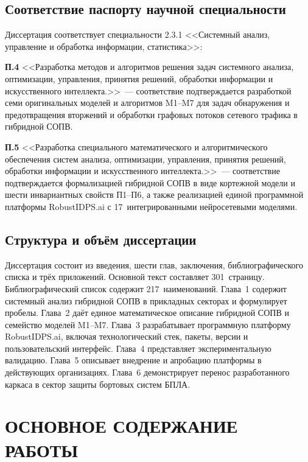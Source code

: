 \documentclass[12pt,a5paper]{article}
\begin{document}
\subsection*{Соответствие паспорту научной специальности}

Диссертация соответствует специальности 2.3.1 <<Системный
анализ, управление и обработка информации, статистика>>:

\noindent\textbf{П.4} <<Разработка методов и алгоритмов
решения задач системного анализа, оптимизации, управления,
принятия решений, обработки информации и искусственного
интеллекта.>>~--- соответствие подтверждается разработкой
семи оригинальных моделей и алгоритмов M1--M7 для задач
обнаружения и предотвращения вторжений и обработки
графовых потоков сетевого трафика в гибридной СОПВ.

\noindent\textbf{П.5} <<Разработка специального
математического и алгоритмического обеспечения систем
анализа, оптимизации, управления, принятия решений,
обработки информации и искусственного интеллекта.>>~---
соответствие подтверждается формализацией гибридной СОПВ в
виде кортежной модели и шести инвариантных свойств П1--П6,
а также реализацией единой программной платформы
RobustIDPS.ai с 17~интегрированными нейросетевыми моделями.

\subsection*{Структура и объём диссертации}

Диссертация состоит из введения, шести глав, заключения,
библиографического списка и трёх приложений. Основной текст
составляет 301~страницу. Библиографический список содержит
217~наименований. Глава~1 содержит системный анализ
гибридной СОПВ в прикладных секторах и формулирует пробелы.
Глава~2 даёт единое математическое описание гибридной СОПВ
и семейство моделей M1--M7. Глава~3 разрабатывает программную
платформу RobustIDPS.ai, включая технологический стек,
пакеты, версии и пользовательский интерфейс. Глава~4
представляет экспериментальную валидацию. Глава~5 описывает
внедрение и апробацию платформы в действующих организациях.
Глава~6 демонстрирует перенос разработанного каркаса в
сектор защиты бортовых систем БПЛА.

\section*{ОСНОВНОЕ СОДЕРЖАНИЕ РАБОТЫ}
\end{document}
